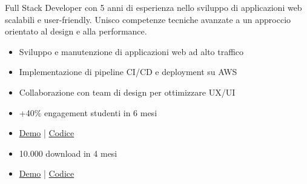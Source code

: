 \documentclass[10pt,a4paper]{altacv}
\begin{document}
\newpage


\makecvheader

Full Stack Developer con 5 anni di esperienza nello sviluppo di applicazioni web scalabili e user-friendly. Unisco competenze tecniche avanzate a un approccio orientato al design e alla performance.

\begin{itemize}
\item Sviluppo e manutenzione di applicazioni web ad alto traffico
\item Implementazione di pipeline CI/CD e deployment su AWS
\item Collaborazione con team di design per ottimizzare UX/UI
\end{itemize}

\begin{itemize}
\item +40\% engagement studenti in 6 mesi
\item \href{#}{Demo} | \href{#}{Codice}
\end{itemize}

\divider

\begin{itemize}
\item 10.000 download in 4 mesi
\item \href{#}{Demo} | \href{#}{Codice}
\end{itemize}

        
\end{document}
